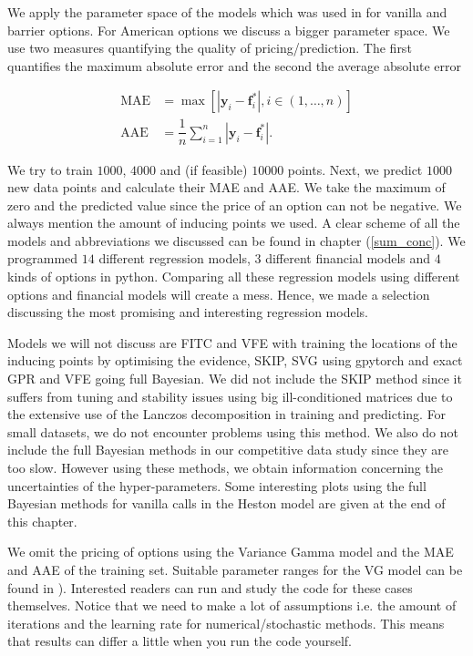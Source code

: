 \documentclass[12pt,a4paper,oneside]{book}
\begin{document}
We apply the parameter space of the models which was used in \cite{de2018machine} for vanilla and barrier options. For American options we discuss a bigger parameter space. We use two measures quantifying the quality of pricing/prediction. The first quantifies the maximum absolute error and the second the average absolute error

\begin{align}
\text{MAE} &= \max \left[ |\bm{y}_i - \bm{f}^{\ast}_i |, i \in (1,\ldots, n) \right]  \\
\text{AAE} &= \dfrac{1}{n} \sum\nolimits_{i=1}^{n} | \bm{y}_i - \bm{f}^{\ast}_i | .
\end{align}

We try to train $1000$, $4000$ and (if feasible) $10000$ points. Next, we predict $1000$ new data points and calculate their MAE and AAE. We take the maximum of zero and the predicted value since the price of an option can not be negative. We always mention the amount of inducing points we used. A clear scheme of all the models and abbreviations we discussed can be found in chapter (\ref{sum_conc}). We programmed $14$ different regression models, $3$ different financial models and $4$ kinds of options in python. Comparing all these regression models using different options and financial models will create a mess. Hence, we made a selection discussing the most promising and interesting regression models.

Models we will not discuss are FITC and VFE with training the locations of the inducing points by optimising the evidence, SKIP, SVG using gpytorch and exact GPR and VFE going full Bayesian. We did not include the SKIP method since it suffers from tuning and stability issues using big ill-conditioned matrices due to the extensive use of the Lanczos decomposition in training and predicting. For small datasets, we do not encounter problems using this method. We also do not include the full Bayesian methods in our competitive data study since they are too slow. However using these methods, we obtain information concerning the uncertainties of the hyper-parameters. Some interesting plots using the full Bayesian methods for vanilla calls in the Heston model are given at the end of this chapter.  

We omit the pricing of options using the Variance Gamma model and the MAE and AAE of the training set. Suitable parameter ranges for the VG model can be found in \cite{de2018machine}).  Interested readers can run and study the code for these cases themselves.  Notice that we need to make a lot of assumptions i.e. the amount of iterations and the learning rate for numerical/stochastic methods. This means that results can differ a little when you run the code yourself.
\end{document}
